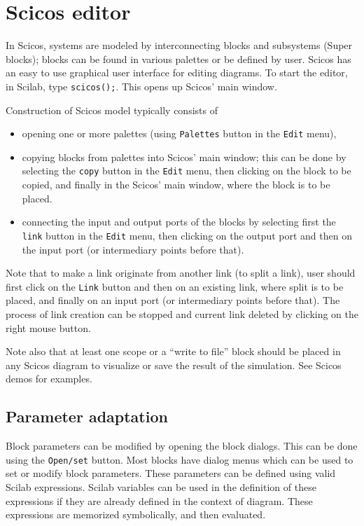 \documentclass{article}
\begin{document}
\section{Scicos editor}
\label{scasm}
\label{ch2}
In Scicos, systems are modeled by interconnecting blocks and subsystems (Super blocks);
blocks can be found in various palettes or be defined by user. Scicos has an easy to use
graphical user interface for editing diagrams. To start the editor, in Scilab, type {\tt scicos();}.
This opens up Scicos' main window.

Construction of Scicos model typically consists of
\begin{itemize}
\item opening one or more palettes (using {\tt Palettes} button in the {\tt Edit} menu),
\item copying blocks from palettes into Scicos' main window; this can be done by
selecting the {\tt copy} button in the {\tt Edit} menu, then clicking on the block to
be copied, and finally in the Scicos' main window, where the block is to be placed. 
\item connecting the input and output ports of the blocks
by selecting first the {\tt link} button in the {\tt Edit} menu, then clicking  on the 
output port and then on the input port (or intermediary points
before that).
\end{itemize}
Note that to make a
link originate  from another link (to split a link), user should first click
on the {\tt Link} button and then on an existing link, where split is
to be placed, and finally on an input port (or intermediary points
before that). The process of link creation can be stopped and current link deleted
by clicking on the right mouse button.

Note also that at least one  scope or a ``write to file'' block should be placed in any Scicos 
diagram to visualize or save the result of the simulation. See Scicos demos for
examples. 

\subsection{Parameter adaptation}
Block parameters can be modified by opening the block dialogs. This can be
done using the {\tt Open/set} button. Most blocks have dialog menus which can be
used to set or modify block parameters. These parameters can be defined using
valid Scilab expressions. Scilab variables can be used in the definition of these
expressions if they are already defined in the context of diagram. These
expressions are memorized symbolically, and
then evaluated. 
\end{document}
